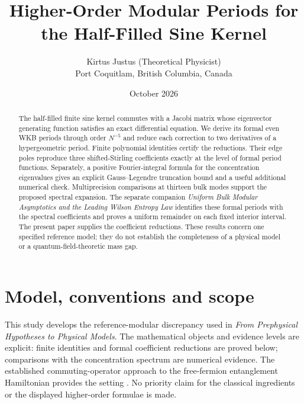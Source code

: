 \documentclass[10pt]{article}
\title{Higher-Order Modular Periods for the Half-Filled Sine Kernel}
\author{Kirtus Justus (Theoretical Physicist)\\\small Port Coquitlam, British Columbia, Canada}
\date{October 2026}
\begin{document}
\maketitle
\begin{abstract}
The half-filled finite sine kernel commutes with a Jacobi matrix whose eigenvector generating function satisfies an exact differential equation. We derive its formal even WKB periods through order $N^{-5}$ and reduce each correction to two derivatives of a hypergeometric period. Finite polynomial identities certify the reductions. Their edge poles reproduce three shifted-Stirling coefficients exactly at the level of formal period functions. Separately, a positive Fourier-integral formula for the concentration eigenvalues gives an explicit Gauss--Legendre truncation bound and a useful additional numerical check. Multiprecision comparisons at thirteen bulk modes support the proposed spectral expansion. The separate companion \emph{Uniform Bulk Modular Asymptotics and the Leading Wilson Entropy Law} identifies these formal periods with the spectral coefficients and proves a uniform remainder on each fixed interior interval. The present paper supplies the coefficient reductions. These results concern one specified reference model; they do not establish the completeness of a physical model or a quantum-field-theoretic mass gap.
\end{abstract}

\section{Model, conventions and scope}
This study develops the reference-modular discrepancy used in \emph{From Prephysical Hypotheses to Physical Models}. The mathematical objects and evidence levels are explicit: finite identities and formal coefficient reductions are proved below; comparisons with the concentration spectrum are numerical evidence. The established commuting-operator approach to the free-fermion entanglement Hamiltonian provides the setting \cite{eisler}. No priority claim for the classical ingredients or the displayed higher-order formulae is made.
\end{document}
